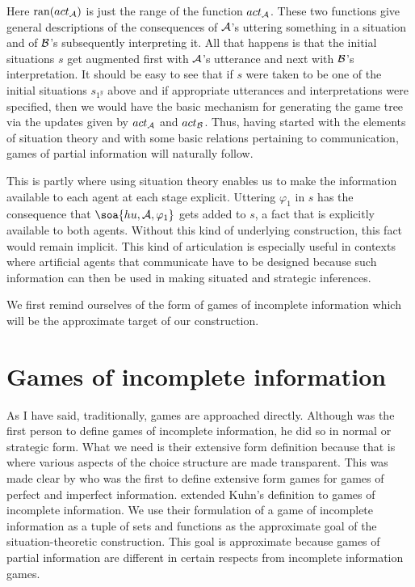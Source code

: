 \noindent Here $\hbox{ran}(act_{\cal A})$ is just the range of the function $act_{\cal A}$. These two functions give general descriptions of the consequences of $\cal A$'s uttering something in a situation and of $\cal B$'s subsequently interpreting it. All that happens is that the initial situations $s$ get augmented first with $\cal A$'s utterance and next with $\cal B$'s interpretation. It should be easy to see that if $s$ were taken to be one of the initial situations $s_{1^y}$ above and if appropriate utterances and interpretations were specified, then we would have the basic mechanism for generating the game tree via the updates given by $act_{\cal A}$ and $act_{\cal B}$. Thus, having started with the elements of situation theory and with some basic relations pertaining to communication, games of partial information will naturally follow.

This is partly where using situation theory enables us to make the information available to each agent at each stage explicit. Uttering $\varphi_1$ in $s$ has the consequence that $\soa{hu,{\cal A},\varphi_1}$ gets added to $s$, a fact that is explicitly available to both agents. Without this kind of underlying construction, this fact would remain implicit. This kind of articulation is especially useful in contexts where artificial agents that communicate have to be designed because such information can then be used in making situated and strategic inferences.

We first remind ourselves of the form of games of incomplete information which will be the approximate target of our construction.


\section{Games of incomplete information}\label{sec:A.3}

As I have said, traditionally, games are approached directly. Although \citet{harsanyi:bayes} was the first person to define games of incomplete information, he did so in normal or strategic form. What we need is their extensive form definition because that is where various aspects of the choice structure are made transparent. This was made clear by \citet{kuhn:egpi} who was the first to define extensive form games for games of perfect and imperfect information. \citet{kw:se} extended Kuhn's definition to games of incomplete information. We use their formulation of a game of incomplete information as a tuple of sets and functions as the approximate goal of 
the situation-theoretic construction. This goal is approximate because games of partial information are different in certain respects from incomplete information games. 


